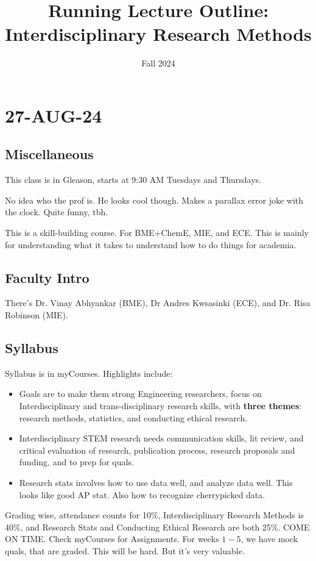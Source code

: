 \documentclass[10pt, oneside]{article}
\title{Running Lecture Outline: Interdisciplinary Research Methods}
\date{Fall 2024}
\begin{document}
\maketitle
\tableofcontents

\vspace{.25in}

\section{27-AUG-24}

\subsection{Miscellaneous}

This class is in Gleason, starts at 9:30 AM Tuesdays and Thursdays.


No idea who the prof is. He looks cool though. Makes a parallax error joke with the clock. Quite funny, tbh.


This is a skill-building course. For BME+ChemE, MIE, and ECE. This is mainly for understanding what it takes to understand how to do things for academia. 

\subsection{Faculty Intro}
There's Dr. Vinay Abhyankar (BME), Dr Andres Kwsasinki (ECE), and Dr. Risa Robinson (MIE). 
\subsection{Syllabus}
Syllabus is in myCourses. Highlights include:
\begin{itemize}
    \item Goals are to make them strong Engineering researchers, focus on Interdisciplinary and trans-disciplinary research skills, with \textbf{three themes}: research methods, statistics, and conducting ethical research.
    \item Interdisciplinary STEM research needs communication skills, lit review, and critical evaluation of research, publication process, research proposals and funding, and to prep for quals. 
    \item Research stats involves how to use data well, and analyze data well. This looks like good AP stat. Also how to recognize cherrypicked data. 
\end{itemize}
Grading wise, attendance counts for 10\%, Interdisciplinary Research Methods is 40\%, and Research Stats and Conducting Ethical Research are both 25\%. COME ON TIME. Check myCourses for Assignments. For weeks $1-5$, we have mock quals, that are graded. This will be hard. But it's very valuable. 
\end{document}
